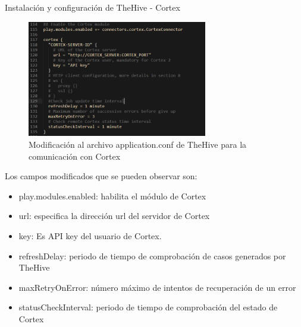 \begin{section}{Instalación y configuración de TheHive - Cortex}
        \begin{figure}[H]
            \centering
            \includegraphics[width=0.7\textwidth]{./iteracion_1_imagenes/figura_40_thehive_cortex_conf.png}
            \caption{Modificación al archivo application.conf de TheHive para la comunicación con Cortex}
            \label{fig:figura_40_thehive_cortex_conf}
        \end{figure}
        Los campos modificados que se pueden observar son:
        \begin{itemize}
            \item play.modules.enabled: habilita el módulo de Cortex
            \item url: especifica la dirección url del servidor de Cortex
            \item key: Es API key del usuario de Cortex.
            \item refreshDelay: periodo de tiempo de comprobación de casos generados por TheHive
            \item maxRetryOnError: número máximo de intentos de recuperación de un error
            \item statusCheckInterval: periodo de tiempo de comprobación del estado de Cortex
        \end{itemize}
        \end{section}
    
